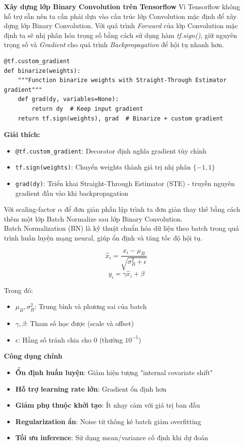 \textbf{Xây dựng lớp Binary Convolution trên Tensorflow}
Vì Tensorflow không hỗ trợ sẵn nên ta cần phải dựa vào cấu trúc lớp Convolution mặc định để xây dựng lớp Binary Convolution. Với quá trình \textit{Forward} của lớp Convolution mặc định ta sẽ nhị phân hóa trọng số bằng cách sử dụng hàm \textit{tf.sign()}, giữ nguyên trọng số và \textit{Gradient} cho quá trình \textit{Backpropagation} để hội tụ nhanh hơn. 
\begin{lstlisting}[style=pythonstyle]
@tf.custom_gradient
def binarize(weights):
    """Function binarize weights with Straight-Through Estimator gradient"""
    def grad(dy, variables=None): 
        return dy  # Keep input gradient
    return tf.sign(weights), grad  # Binarize + custom gradient
\end{lstlisting}
\noindent\textbf{Giải thích:}
\begin{itemize}
    \item \texttt{@tf.custom\_gradient}: Decorator định nghĩa gradient tùy chỉnh
    \item \texttt{tf.sign(weights)}: Chuyển weights thành giá trị nhị phân $\{-1, 1\}$
    \item \texttt{grad(dy)}: Triển khai Straight-Through Estimator (STE) - truyền nguyên gradient đầu vào khi backpropagation
\end{itemize}

Với scaling-factor $\alpha$ để đơn giản phần lập trình ta đơn giản thay thế bằng cách thêm một lớp Batch Normalize sau lớp Binary Convolution. \\

Batch Normalization (BN) là kỹ thuật chuẩn hóa dữ liệu theo batch trong quá trình huấn luyện mạng neural, giúp ổn định và tăng tốc độ hội tụ.

\begin{equation}
    \hat{x}_i = \frac{x_i - \mu_B}{\sqrt{\sigma_B^2 + \epsilon}}
\end{equation}
\begin{equation}
    y_i = \gamma \hat{x}_i + \beta
\end{equation}


Trong đó:
\begin{itemize}
\item $\mu_B, \sigma_B^2$: Trung bình và phương sai của batch
\item $\gamma, \beta$: Tham số học được (scale và offset)
\item $\epsilon$: Hằng số tránh chia cho 0 (thường $10^{-5}$)
\end{itemize}
\textbf{Công dụng chính}
\begin{itemize}
    \item \textbf{Ổn định huấn luyện}: Giảm hiện tượng "internal covariate shift"
    \item \textbf{Hỗ trợ learning rate lớn}: Gradient ổn định hơn
    \item \textbf{Giảm phụ thuộc khởi tạo}: Ít nhạy cảm với giá trị ban đầu
    \item \textbf{Regularization ẩn}: Noise từ thống kê batch giảm overfitting
    \item \textbf{Tối ưu inference}: Sử dụng mean/variance cố định khi dự đoán
\end{itemize}

